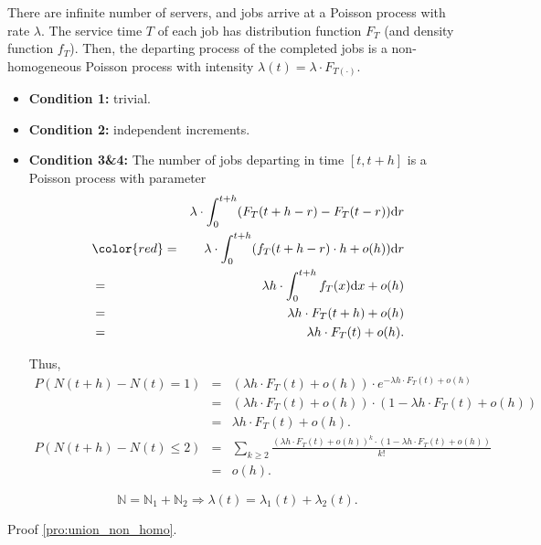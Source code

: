 \begin{example}
There are infinite number of servers, and jobs arrive at a Poisson process with rate $ \lambda $. The service time $ T $ of each job has distribution function $ F_{T} $ (and density function $ f_{T} $). Then, the departing process of the completed jobs is a non-homogeneous Poisson process with intensity $ \lambda(t) = \lambda \cdot F_{T(\cdot)} $.

\begin{itemize}
\item \textbf{Condition 1:} trivial.
\item \textbf{Condition 2:} independent increments.

\item \textbf{Condition 3\&4:}
The number of jobs departing in time $ [t, t + h] $ is a Poisson process with parameter 
\begin{eqnarray*}
  &   & \lambda \cdot \int_{0}^{t + h} (F_{T}(t + h - r) - F_{T}(t - r)) \mathrm{d}r \\
  & {\color{red}=} & \lambda \cdot \int_{0}^{t + h} (f_{T}(t + h - r) \cdot h + o(h)) \mathrm{d}r \\
  & = & \lambda h \cdot \int_{0}^{t + h} f_{T}(x) \mathrm{d}x + o(h) \\
  & = & \lambda h \cdot F_{T}(t + h) + o(h) \\
  & = & \lambda h \cdot F_{T}(t) + o(h).
\end{eqnarray*}

Thus,
\begin{eqnarray*}
P(N(t + h) - N(t) = 1)
  & = & (\lambda h \cdot F_{T}(t) + o(h)) \cdot e^{-\lambda h \cdot F_{T}(t) + o(h)} \\
  & = & (\lambda h \cdot F_{T}(t) + o(h)) \cdot (1 - \lambda h \cdot F_{T}(t) + o(h)) \\
  & = & \lambda h \cdot F_{T}(t) + o(h). \\
P(N(t + h) - N(t) \le 2)
  & = & \sum_{k \ge 2} \frac{(\lambda h \cdot F_{T}(t) + o(h))^{k} \cdot (1 - \lambda h \cdot F_{T}(t) + o(h))}{k!} \\
  & = & o(h).
\end{eqnarray*}
\end{itemize}

\begin{comment}
\begin{eqnarray*}
  & \because & \lim_{h \to 0} \frac{F_{T}(t + h - r) - F_{T}(t - r)}{h} - f_{T}(t + h - r) = 0 \\
  & \therefore & \frac{F_{T}(t + h - r) - F_{T}(t - r)}{h} = f_{T}(t + h - r) + \frac{o(h)}{h}
\end{eqnarray*}
\end{comment}
\end{example}

\begin{proposition} \label{pro:union_non_homo}
\[ \mathbb{N} = \mathbb{N}_{1} + \mathbb{N}_{2} \Rightarrow \lambda(t) = \lambda_{1}(t) + \lambda_{2}(t). \]
\end{proposition}

\begin{exercise}
Proof \autoref{pro:union_non_homo}.
\end{exercise}
